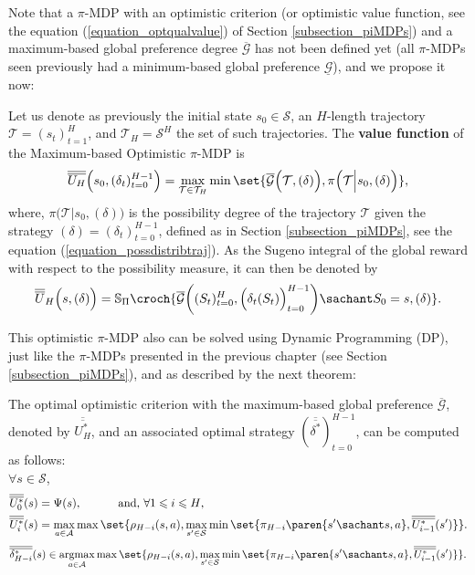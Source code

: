 Note that a $\pi$-MDP with an optimistic criterion (or optimistic value function, see the equation (\ref{equation_optqualvalue}) of Section \ref{subsection_piMDPs})
and a maximum-based global preference degree $\overline{\mathcal{G}}$ has not been defined yet 
(all $\pi$-MDPs seen previously had a minimum-based global preference $\underline{\mathcal{G}}$),
and we propose it now:

\begin{Def}
\label{def_optpiMDPmaxbased}
Let us denote as previously the initial state $s_0 \in \mathcal{S}$,
an $H$-length trajectory $\mathcal{T} = (s_t)_{t=1}^H$,
and $\mathcal{T}_H = \mathcal{S}^{H}$ the set of such trajectories.
The \textbf{value function} of the Maximum-based Optimistic $\pi$-MDP is
\[ \overline{\overline{U_H}} \Big( s_0,(\delta_t)_{t=0}^{H-1} \Big) = \max_{\mathcal{T} \in \mathcal{T}_H} \min \set{ \overline{\mathcal{G}} \Big( \mathcal{T}, (\delta) \Big), \pi \Big( \mathcal{T} \Big\vert s_0, (\delta) \Big) }, \]
where, $\pi \Big( \mathcal{T} \Big\vert s_0, (\delta) \Big)$ is the possibility degree of the 
trajectory $\mathcal{T}$ given the strategy $(\delta) = (\delta_t)_{t=0}^{H-1}$, defined as in Section \ref{subsection_piMDPs}, see the equation (\ref{equation_possdistribtraj}).
As the Sugeno integral of the global reward with respect to the possibility measure, 
it can then be denoted by
\[ \overline{\overline{U}}_H \Big( s, (\delta) \Big) = \mathbb{S}_{\Pi} \croch{ \overline{\mathcal{G}} \bigg( (S_t)_{t=0}^{H}, \Big(\delta_t(S_t)\Big)_{t=0}^{H-1}  \bigg) \sachant S_0 = s, (\delta) }. \]
\end{Def}
This optimistic $\pi$-MDP also can be solved using Dynamic Programming (DP),  
just like the $\pi$-MDPs presented in the previous chapter (see Section \ref{subsection_piMDPs}),
and as described by the next theorem:
\begin{theorem}
\label{theorem_optpiMDPglobalmax}
The optimal optimistic criterion with the maximum-based global preference $\overline{\mathcal{G}}$,
denoted by $\overline{\overline{U_H^*}}$, 
and an associated optimal strategy $(\overline{\overline{\delta^*}})_{t=0}^{H-1}$,
can be computed as follows:\\ 
$\forall s \in \mathcal{S}$,
\begin{align}
\nonumber 
\overline{\overline{U_0^*}}(s) & = \Psi(s), \mbox{\hspace{1cm} and, $\forall 1 \leqslant i \leqslant H$,} \\
\label{equation_recursiveoptmax} 
\overline{\overline{U_{i}^*}}(s)& = \max_{a \in \mathcal{A}} \max \set{ \rho_{H-i}(s,a), \max_{s' \in \mathcal{S}} \min \set{ \pi_{H-i} \paren{ s' \sachant s, a  } , \overline{\overline{U^*_{i-1}}}(s') }  }.
\end{align}
\begin{eqnarray}
\label{equation_recursiveoptstratmax} 
\overline{\overline{\delta^*_{H-i}}}(s) \in \operatorname*{argmax}_{a \in \mathcal{A}} \max \set{ \rho_{H-i}(s,a), \max_{s' \in \mathcal{S}} \min \set{ \pi_{H-i} \paren{ s' \sachant s, a  } , \overline{\overline{U^*_{i-1}}}(s') }  }.
\end{eqnarray}
\end{theorem}
